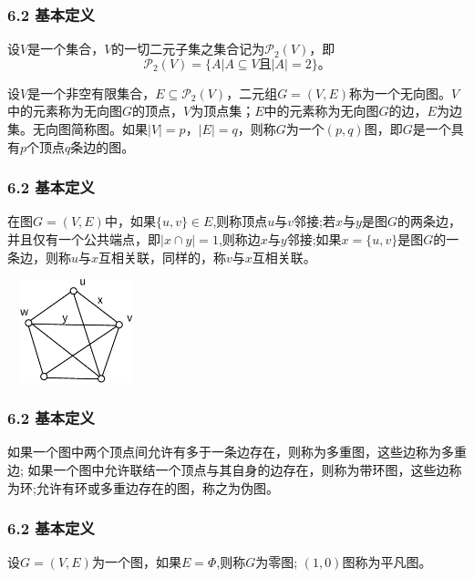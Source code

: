 \documentclass{beamer}
\begin{document}
\begin{CJK*}{UTF8}{gbsn}
\begin{frame}
  \frametitle{6.2 基本定义}
设$V$是一个集合，$V$的一切二元子集之集合记为$\mathcal{P}_2(V)$，即
\begin{equation*}
  \mathcal{P}_2(V) = \{A|A \subseteq V \text{且} |A| = 2\}\text{。}
\end{equation*}
\begin{definition6.2.1}
  设$V$是一个非空有限集合，$E \subseteq \mathcal{P}_2(V)$，二元组$G = (V, E)$称为一个\alert{无向图}。$V$中的元素称为无向图$G$的\alert{顶点}，$V$为\alert{顶点集}；$E$中的元素称为无向图$G$的\alert{边}，$E$为\alert{边集}。无向图简称\alert{图}。如果$|V|=p$，$|E|=q$，则称$G$为一个$(p,q)$图，即$G$是一个具有$p$个顶点$q$条边的图。
\end{definition6.2.1}

\end{frame}


\begin{frame}
  \frametitle{6.2 基本定义}
  \begin{definition6.2.2}
    在图$G=(V,E)$中，如果$\{u,v\}\in E$,则称\alert{顶点$u$与$v$邻接};若$x$与$y$是图$G$的两条边，并且仅有一个公共端点，即$|x \cap y|= 1$,则称\alert{边$x$与$y$邻接};如果$x=\{u,v\}$是图$G$的一条边，则称\alert{$u$与$x$互相关联}，同样的，称\alert{$v$与$x$互相关联}。
  \end{definition6.2.2}
\centering
    \includegraphics[width=4cm,height=3cm]{graph}
\end{frame}

\begin{frame}
  \frametitle{6.2 基本定义}
  \begin{definition6.2.3}
   如果一个图中两个顶点间允许有多于一条边存在，则称为\alert{多重图}，这些边称为\alert{多重边}; 如果一个图中允许联结一个顶点与其自身的边存在，则称为\alert{带环图}，这些边称为\alert{环};允许有环或多重边存在的图，称之为\alert{伪图}。
  \end{definition6.2.3}
\end{frame}


\begin{frame}
  \frametitle{6.2 基本定义}
  \begin{definition6.2.4}
设$G=(V,E)$为一个图，如果$E=\Phi$,则称$G$为\alert{零图}; $(1,0)$图称为\alert{平凡图}。    
  \end{definition6.2.4}
\end{frame}




\end{CJK*}
\end{document}
